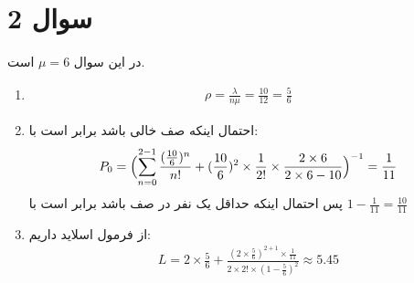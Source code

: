 \section*{سوال 2}
در این سوال
$\mu = 6$
است.
\begin{enumerate}
    \item \phantom{فاک} \begin{gather*}
        \rho = \frac{\lambda}{n\mu} = \frac{10}{12} = \frac{5}{6}
    \end{gather*}
    \item احتمال اینکه صف خالی باشد برابر است با:
    \begin{gather*}
        P_0 = \Bigl(\sum_{n=0}^{2-1} \frac{(\frac{10}{6})^n}{n!} + (\frac{10}{6})^2 \times \frac{1}{2!} \times \frac{2 \times 6}{2 \times 6 - 10}\Bigr)^{-1} = \frac{1}{11}
    \end{gather*}
    پس احتمال اینکه حداقل یک نفر در صف باشد برابر است با
    $1-\frac{1}{11} = \frac{10}{11}$
    \item از فرمول اسلاید داریم:
    \begin{gather*}
        L = 2 \times \frac{5}{6} + \frac{(2 \times \frac{5}{6})^{2+1} \times \frac{1}{11}}{2 \times 2! \times (1 - \frac{5}{6})^2} \approx 5.45
    \end{gather*}
\end{enumerate}
